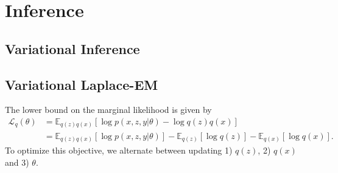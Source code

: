 \documentclass{article}
\begin{document}
%

\section{Inference}

\subsection{Variational Inference}

\subsection{Variational Laplace-EM}

The lower bound on the marginal likelihood is given by
\begin{align*}
\mathcal{L}_q(\theta) & = \mathbb{E}_{q(z) q(x)}[\log p(x, z, y | \theta) - \log q(z) q(x)] \\
& = \mathbb{E}_{q(z) q(x)}[\log p(x, z, y | \theta)] - \mathbb{E}_{q(z)}[\log q(z)] - \mathbb{E}_{q(x)}[\log q(x)].
\end{align*}
To optimize this objective, we alternate between updating 1) $q(z)$, 2) $q(x)$ and 3) $\theta$. 
\end{document}
